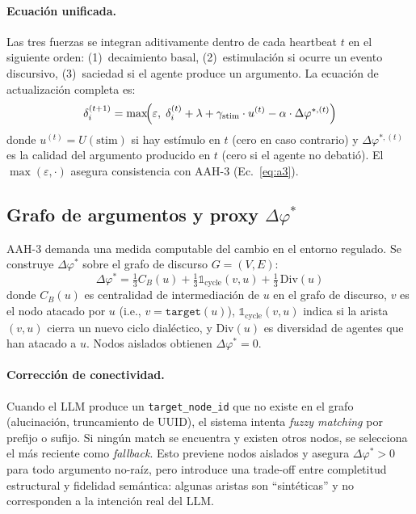 \documentclass{llncs}
\begin{document}
\paragraph{Ecuaci\'on unificada.}
Las tres fuerzas se integran aditivamente dentro de cada heartbeat $t$
en el siguiente orden: (1)~decaimiento basal, (2)~estimulaci\'on si
ocurre un evento discursivo, (3)~saciedad si el agente produce un
argumento. La ecuaci\'on de actualizaci\'on completa es:
\begin{equation}
    \delta_i^{(t+1)} = \max\!\Bigl(\varepsilon,\; \delta_i^{(t)} + \lambda
    + \gamma_{\text{stim}} \cdot u^{(t)} - \alpha \cdot \Delta\varphi^{*,(t)}\Bigr)
    \label{eq:unified}
\end{equation}
donde $u^{(t)} = U(\text{stim})$ si hay est\'imulo en $t$ (cero en caso
contrario) y $\Delta\varphi^{*,(t)}$ es la calidad del argumento producido
en $t$ (cero si el agente no debati\'o). El $\max(\varepsilon,\cdot)$
asegura consistencia con AAH-3 (Ec.~\ref{eq:a3}).

\subsection{Grafo de argumentos y proxy $\Delta\varphi^*$}
\label{sec:phi}

AAH-3 demanda una medida computable del cambio en el entorno regulado.
Se construye $\Delta\varphi^*$ sobre el grafo de discurso $G{=}(V,E)$:
\begin{equation}
    \Delta\varphi^* = \tfrac{1}{3} C_B(u) + \tfrac{1}{3}
        \mathbb{1}_{\text{cycle}}(v,u) + \tfrac{1}{3}\,\mathrm{Div}(u)
    \label{eq:phi}
\end{equation}
donde $C_B(u)$ es centralidad de intermediaci\'on de $u$ en el grafo de
discurso, $v$ es el nodo atacado por $u$ (i.e., $v = \texttt{target}(u)$),
$\mathbb{1}_{\text{cycle}}(v,u)$ indica si la arista $(v,u)$ cierra un
nuevo ciclo dial\'ectico, y $\mathrm{Div}(u)$ es diversidad de
agentes que han atacado a $u$. Nodos aislados obtienen
$\Delta\varphi^* = 0$.

\paragraph{Correcci\'on de conectividad.}
Cuando el LLM produce un \texttt{target\_node\_id} que no existe en el
grafo (alucinaci\'on, truncamiento de UUID), el sistema intenta
\emph{fuzzy matching} por prefijo o sufijo. Si ning\'un match se
encuentra y existen otros nodos, se selecciona el m\'as reciente como
\emph{fallback}. Esto previene nodos aislados y asegura
$\Delta\varphi^* > 0$ para todo argumento no-ra\'iz, pero introduce una
trade-off entre completitud estructural y fidelidad sem\'antica: algunas
aristas son ``sint\'eticas'' y no corresponden a la intenci\'on real del
LLM.
\end{document}
